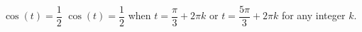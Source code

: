 {$\cos(t) = \dfrac{1}{2}$}
{$\cos(t) = \dfrac{1}{2}$ when $t = \dfrac{\pi}{3} + 2\pi k$ or $t = \dfrac{5\pi}{3} + 2\pi k$ for any integer $k$.}
